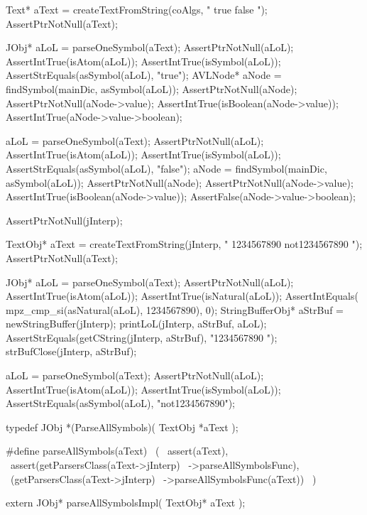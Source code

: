   Text* aText = createTextFromString(coAlgs, " true false ");
  AssertPtrNotNull(aText);

  JObj* aLoL = parseOneSymbol(aText);
  AssertPtrNotNull(aLoL);
  AssertIntTrue(isAtom(aLoL));
  AssertIntTrue(isSymbol(aLoL));
  AssertStrEquals(asSymbol(aLoL), "true");
  AVLNode* aNode = findSymbol(mainDic, asSymbol(aLoL));
  AssertPtrNotNull(aNode);
  AssertPtrNotNull(aNode->value);
  AssertIntTrue(isBoolean(aNode->value));
  AssertIntTrue(aNode->value->boolean);

  aLoL = parseOneSymbol(aText);
  AssertPtrNotNull(aLoL);
  AssertIntTrue(isAtom(aLoL));
  AssertIntTrue(isSymbol(aLoL));
  AssertStrEquals(asSymbol(aLoL), "false");
  aNode = findSymbol(mainDic, asSymbol(aLoL));
  AssertPtrNotNull(aNode);
  AssertPtrNotNull(aNode->value);
  AssertIntTrue(isBoolean(aNode->value));
  AssertFalse(aNode->value->boolean);
\stopCTest
\skipTestCase

\startCTest
  AssertPtrNotNull(jInterp);

  TextObj* aText =
    createTextFromString(jInterp, " 1234567890 not1234567890 ");
  AssertPtrNotNull(aText);

  JObj* aLoL = parseOneSymbol(aText);
  AssertPtrNotNull(aLoL);
  AssertIntTrue(isAtom(aLoL));
  AssertIntTrue(isNatural(aLoL));
  AssertIntEquals( mpz_cmp_si(asNatural(aLoL), 1234567890), 0);
  StringBufferObj* aStrBuf = newStringBuffer(jInterp);
  printLoL(jInterp, aStrBuf, aLoL);
  AssertStrEquals(getCString(jInterp, aStrBuf), "1234567890 ");
  strBufClose(jInterp, aStrBuf);

  aLoL = parseOneSymbol(aText);
  AssertPtrNotNull(aLoL);
  AssertIntTrue(isAtom(aLoL));
  AssertIntTrue(isSymbol(aLoL));
  AssertStrEquals(asSymbol(aLoL), "not1234567890");
\stopCTest
\stopTestCase
\stopTestSuite


\startCHeader
typedef JObj *(ParseAllSymbols)(
  TextObj *aText
);

#define parseAllSymbols(aText)              \
  (                                         \
    assert(aText),                          \
    assert(getParsersClass(aText->jInterp)  \
      ->parseAllSymbolsFunc),               \
    (getParsersClass(aText->jInterp)        \
      ->parseAllSymbolsFunc(aText))         \
  )
\stopCHeader

\setCHeaderStream{private}
\startCHeader
extern JObj* parseAllSymbolsImpl(
  TextObj* aText
);
\stopCHeader
{}

